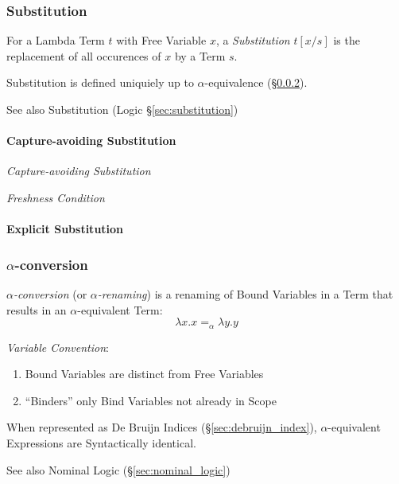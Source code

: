 \subsubsection{Substitution}\label{sec:lambda_substitution}

For a Lambda Term $t$ with Free Variable $x$, a \emph{Substitution}
$t[x/s]$ is the replacement of all occurences of $x$ by a Term $s$.

Substitution is defined uniquiely up to $\alpha$-equivalence
(\S\ref{sec:alpha_conversion}).

\fist See also Substitution (Logic \S\ref{sec:substitution})



\paragraph{Capture-avoiding Substitution}\label{sec:capture_avoiding}\hfill

\emph{Capture-avoiding Substitution}

\emph{Freshness Condition}



\paragraph{Explicit Substitution}\label{sec:explicit_substitution}\hfill



\subsubsection{$\alpha$-conversion}\label{sec:alpha_conversion}

\emph{$\alpha$-conversion} (or \emph{$\alpha$-renaming}) is a renaming
of Bound Variables in a Term that results in an $\alpha$-equivalent
Term:
\[
  \lambda x.x =_\alpha \lambda y.y
\]

\emph{Variable Convention}:
\begin{enumerate}
  \item Bound Variables are distinct from Free Variables
  \item ``Binders'' only Bind Variables not already in Scope %
\end{enumerate}

When represented as De Bruijn Indices (\S\ref{sec:debruijn_index}),
$\alpha$-equivalent Expressions are Syntactically identical.

\fist See also Nominal Logic (\S\ref{sec:nominal_logic})



